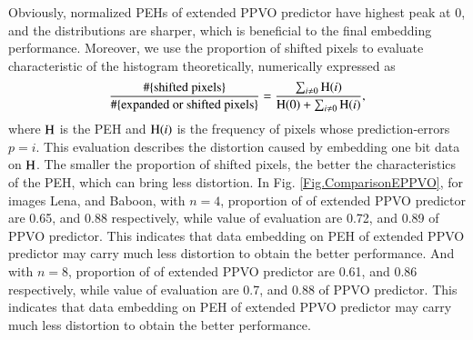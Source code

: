 \documentclass[review,3p,10pt,sort&compress]{elsarticle}
\begin{document}
Obviously, normalized PEHs of extended PPVO predictor have highest peak at $0$, and the distributions are sharper, which is beneficial to the final embedding performance.
Moreover, we use the proportion of shifted pixels \cite{Li2013PVO} to evaluate characteristic of the histogram theoretically, numerically expressed as
\begin{equation}\label{eq:Pshift}
    \frac{\#\{{\rm shifted\ pixels}\}}{\#\{{\rm expanded\ or\ shifted\ pixels}\}} = \frac{\sum_{i \neq 0}{\rm H}(i)}{{\rm H}(0) + \sum_{i \neq 0}{\rm H}(i)},
\end{equation}
where ${\rm H}$ is the PEH and ${\rm H}(i)$ is the frequency of pixels whose prediction-errors $p = i$. This evaluation describes the distortion caused by embedding one bit data on ${\rm H}$. The smaller the proportion of shifted pixels, the better the characteristics of the PEH, which can bring less distortion. In Fig. \ref{Fig.ComparisonEPPVO}, for images Lena, and Baboon, with $n = 4$, proportion of of extended PPVO predictor are 0.65, and 0.88 respectively, while value of evaluation are 0.72, and 0.89 of PPVO predictor. This indicates that data embedding on PEH of extended PPVO predictor may carry much less distortion to obtain the better performance. And with $n = 8$, proportion of of extended PPVO predictor are 0.61, and 0.86 respectively, while value of evaluation are 0.7, and 0.88 of PPVO predictor. This indicates that data embedding on PEH of extended PPVO predictor may carry much less distortion to obtain the better performance.
\end{document}
